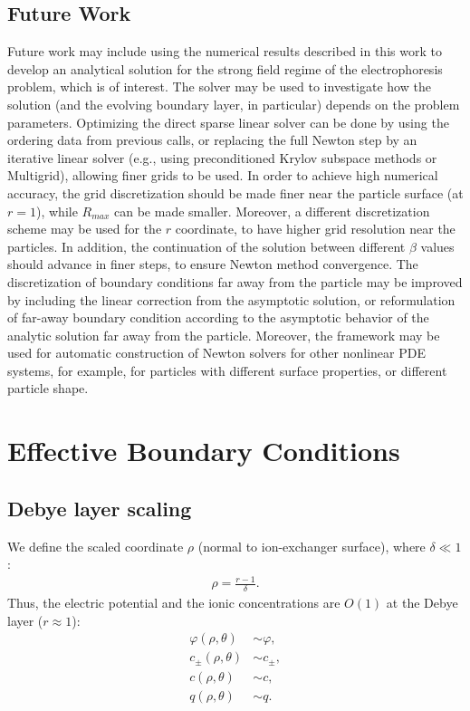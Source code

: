 \documentclass[MSc,beforeExam]{iitcsthesis}
\begin{document}
\section{Future Work}
Future work may include using the numerical results described in this work to develop
an analytical solution for the strong field regime of the electrophoresis problem, which is 
of interest. The solver may be used to investigate how the solution
(and the evolving boundary layer, in particular) depends on the problem parameters.
Optimizing the direct sparse linear solver can be done by
using the ordering data from previous calls,
or replacing the full Newton step by an iterative linear solver
(e.g., using preconditioned Krylov subspace methods \cite{saad2003book} or
Multigrid), allowing finer grids to be used.
In order to achieve high numerical accuracy, the grid discretization should be made finer
near the particle surface (at $r = 1$), while $R_{max}$ can be made smaller. Moreover, a different discretization scheme may be used for
the $r$ coordinate, to have higher grid resolution near the particles.
In addition, the continuation of the solution between different $\beta$ values
should advance in finer steps, to ensure Newton method convergence.
The discretization of boundary conditions far away from the particle may be improved
by including the linear correction from the asymptotic solution, or reformulation of
far-away boundary condition according to the asymptotic behavior of the analytic solution
far away from the particle.
Moreover, the framework may be used for automatic construction of Newton solvers 
for other nonlinear PDE systems, for example, for particles with different surface 
properties, or different particle shape.

\appendix

\chapter{Effective Boundary Conditions} \label{append:slip}

\section{Debye layer scaling}

We define the scaled coordinate $\rho$ (normal to ion-exchanger surface), where $\delta \ll 1$:
\begin{align}
  \rho = \frac{r-1}{\delta}. 
\end{align}
Thus, the electric potential and the ionic concentrations are $O(1)$ at the Debye layer ($r \approx 1$):
\begin{align}
  \varphi(\rho,\theta) &\sim \varphi, \\
  c_\pm(\rho,\theta) &\sim c_\pm, \\
  c(\rho,\theta) &\sim c, \\
  q(\rho,\theta) &\sim q.
\end{align}
\end{document}
